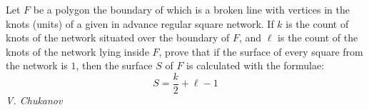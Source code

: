 Let $F$ be a polygon the boundary of which is a broken line with vertices in the knots (units) of a given in advance regular square network. If $k$ is the count of knots of the network situated over the boundary of $F$, and $\ell$ is the count of the knots of the network lying inside $F$, prove that if the surface of every square from the network is $1$, then the surface $S$ of $F$ is calculated with the formulae:
$$S=\frac k2+\ell-1$$
\textit{V. Chukanov}